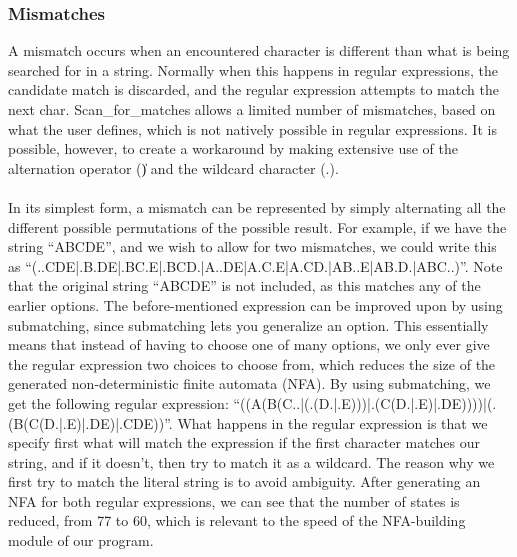 \subsubsection*{Mismatches}
A mismatch occurs when an encountered character is different than what is being 
searched for in a string. Normally when this happens in regular expressions, 
the candidate match is discarded, and the regular expression attempts to 
match the next char. Scan\_for\_matches allows a limited number 
of mismatches, based on what the user defines, which is not natively possible 
in regular expressions. It is possible, however, to create a workaround by 
making extensive use of the alternation operator (\|) and the wildcard character 
(.).\\\\
In its simplest form, a mismatch can be represented by simply alternating 
all the different possible permutations of the possible result. For example, 
if we have the string ``ABCDE'', and we wish to allow for two mismatches, we 
could write this as ``(..CDE|.B.DE|.BC.E|.BCD.|A..DE|A.C.E|A.CD.|AB..E|AB.D.|ABC..)''. 
Note that the original string ``ABCDE'' is not included, as this matches any of 
the earlier options. The before-mentioned expression can be improved upon by using 
submatching, since submatching lets you generalize an option. This essentially 
means that instead of having to choose one of many options, we only ever 
give the regular expression two choices to choose from, which reduces the size 
of the generated non-deterministic finite automata (NFA). By using submatching, 
we get the following regular expression: 
``((A(B(C..|(.(D.|.E)))|.(C(D.|.E)|.DE))))|(.(B(C(D.|.E)|.DE)|.CDE))''.
What happens in the regular expression is that we specify first what will 
match the expression if the first character matches our string, and if it doesn't, 
then try to match it as a wildcard. The reason why we first try to match 
the literal string is to avoid ambiguity. After generating an NFA for both 
regular expressions, we can see that the number of states is reduced, from 
77 to 60, which is relevant to the speed of the NFA-building module of our 
program.\\\\

